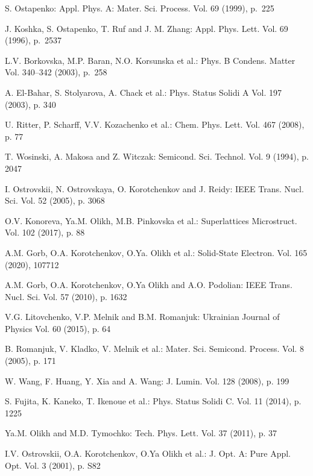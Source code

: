 \documentclass{ttp}
\begin{document}
\begin{thebibliography}{99}

 S. Ostapenko: Appl. Phys. A: Mater. Sci. Process. Vol. 69 (1999), p.~225

 J. Koshka, S. Ostapenko, T. Ruf and J. M. Zhang: Appl. Phys. Lett. Vol. 69 (1996), p.~2537

 L.V. Borkovska, M.P. Baran, N.O. Korsunska et al.: Phys. B Condens. Matter Vol. 340–342 (2003), p.~258

 A. El-Bahar, S. Stolyarova, A. Chack et al.: Phys. Status Solidi A Vol. 197 (2003), p. 340

 U. Ritter, P. Scharff, V.V. Kozachenko et al.: Chem. Phys. Lett. Vol. 467 (2008), p. 77

 T. Wosinski, A. Makosa and Z. Witczak: Semicond. Sci. Technol. Vol. 9 (1994), p. 2047

 I. Ostrovskii, N. Ostrovskaya, O. Korotchenkov and J. Reidy: IEEE Trans. Nucl. Sci. Vol. 52 (2005), p. 3068

 O.V. Konoreva, Ya.M. Olikh, M.B. Pinkovska et al.: Superlattices Microstruct. Vol. 102 (2017), p. 88

 A.M. Gorb, O.A. Korotchenkov, O.Ya. Olikh et al.: Solid-State Electron. Vol. 165 (2020), 107712

 A.M. Gorb, O.A. Korotchenkov, O.Ya Olikh and A.O. Podolian: IEEE Trans. Nucl. Sci. Vol. 57 (2010), p. 1632

 V.G. Litovchenko, V.P. Melnik and B.M. Romanjuk: Ukrainian Journal of Physics Vol. 60 (2015), p. 64

 B. Romanjuk, V. Kladko, V. Melnik et al.: Mater. Sci. Semicond. Process. Vol. 8 (2005), p. 171

 W. Wang, F. Huang, Y. Xia and A. Wang: J. Lumin. Vol. 128 (2008), p. 199

 S. Fujita, K. Kaneko, T. Ikenoue et al.: Phys. Status Solidi C. Vol. 11 (2014), p. 1225

 Ya.M. Olikh  and  M.D. Tymochko: Tech. Phys. Lett. Vol. 37 (2011), p. 37

 I.V. Ostrovskii, O.A. Korotchenkov, O.Ya Olikh et al.: J. Opt. A: Pure Appl. Opt. Vol. 3 (2001), p. S82


\end{thebibliography}
\end{document}
